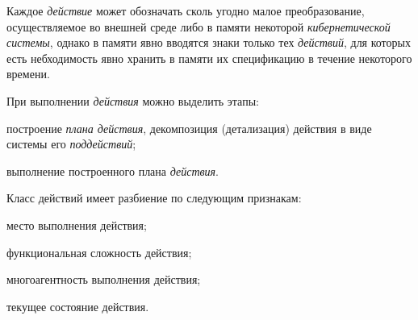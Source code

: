 Каждое \textit{действие} может обозначать сколь угодно малое преобразование, осуществляемое во внешней среде либо в памяти некоторой \textit{кибернетической системы}, однако в памяти явно вводятся знаки только тех \textit{действий}, для которых есть небходимость явно хранить в памяти их спецификацию в течение некоторого времени.

\bigskip
При выполнении \textit{действия} можно выделить этапы:
\begin{textitemize}
	\item построение \textit{плана действия}, декомпозиция (детализация) действия в виде системы его \textit{поддействий};
	\item выполнение построенного плана \textit{действия}.
\end{textitemize}

Класс действий имеет разбиение по следующим признакам:
\begin{textitemize}
	\item место выполнения действия;
	\item функциональная сложность действия;
	\item многоагентность выполнения действия;
	\item текущее состояние действия.
\end{textitemize}

